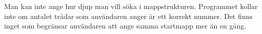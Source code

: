 Man kan inte ange hur djup man vill söka i mappstrukturen. Programmet kollar inte om antalet trådar som användaren anger är ett korrekt nummer. Det finns inget som begränsar användaren att ange samma startmapp mer än en gång. 